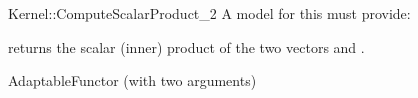 \begin{ccRefFunctionObjectConcept}{Kernel::ComputeScalarProduct_2}
A model for this must provide:


{returns the scalar (inner) product of the two vectors  and .}

\ccRefines
AdaptableFunctor (with two arguments)

\ccSeeAlso
{}\\

\end{ccRefFunctionObjectConcept}
